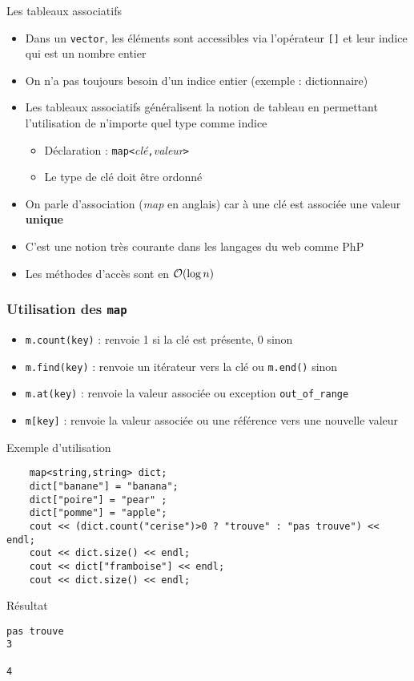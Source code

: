 \begin{frame}{Les tableaux associatifs}
\begin{itemize}
\item Dans un \texttt{vector}, les éléments sont accessibles via l'opérateur \texttt{[]} et leur indice qui est un nombre entier
\item On n'a pas toujours besoin d'un indice entier (exemple : dictionnaire)
\item Les tableaux associatifs généralisent la notion de tableau en permettant l'utilisation de n'importe quel type comme indice
\begin{itemize}
\item Déclaration : \texttt{map<}\textit{clé}\texttt{,}\textit{valeur}\texttt{>} 
\item Le type de clé doit être ordonné
\end{itemize}
\item On parle d'association (\textit{map} en anglais) car à une clé  est associée une valeur \textbf{unique}
\item C'est une notion très courante dans les langages du web comme PhP
\item Les méthodes d'accès sont en ${\cal O}(\log n)$
\end{itemize}
\end{frame}

\begin{frame}[fragile]\frametitle{Utilisation des \texttt{map}}
\begin{itemize}
\item \verb|m.count(key)| : renvoie 1 si la clé est présente, 0 sinon
\item \verb|m.find(key)| : renvoie un itérateur vers la clé ou \verb|m.end()| sinon
\item \verb|m.at(key)| : renvoie la valeur associée  ou exception \verb|out_of_range|
\item \verb|m[key]| : renvoie la valeur associée ou une référence vers une nouvelle valeur
\end{itemize}
\begin{codeblock}{Exemple d'utilisation}
\begin{lstlisting}
    map<string,string> dict;
    dict["banane"] = "banana";
    dict["poire"] = "pear" ;
    dict["pomme"] = "apple";
    cout << (dict.count("cerise")>0 ? "trouve" : "pas trouve") << endl;
    cout << dict.size() << endl;
    cout << dict["framboise"] << endl;
    cout << dict.size() << endl;
\end{lstlisting}
\end{codeblock}
\begin{exampleblock}{Résultat}
{\tiny
\begin{verbatim}
pas trouve
3

4
\end{verbatim}
}
\end{exampleblock}
\end{frame}

